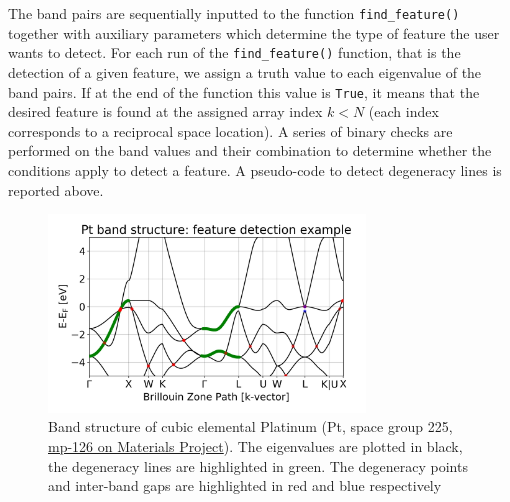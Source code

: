 \documentclass{article}
\begin{document}
The band pairs are sequentially inputted to the function  \texttt{find\_feature()} together with auxiliary parameters which determine the type of feature the user wants to detect. For each run of the \texttt{find\_feature()} function, that is the detection of a given feature, we assign a truth value to each eigenvalue of the band pairs. If at the end of the function this value is \texttt{True}, it means that the desired feature is found at the assigned array index $k < N$ (each index corresponds to a reciprocal space location). A series of binary checks are performed on the band values and their combination to determine whether the conditions apply to detect a feature. A pseudo-code to detect degeneracy lines is reported above.

\begin{figure}[H]
    \centering
    \includegraphics[width=0.75\textwidth]{SI/figures/mp-126_band-structure_features.png}
    \caption{Band structure of cubic elemental Platinum (Pt, space group 225, \href{https://materialsproject.org/materials/mp-126/}{mp-126 on Materials Project}). The eigenvalues are plotted in black, the degeneracy lines are highlighted in green. The degeneracy points and inter-band gaps are highlighted in red and blue respectively}
    \label{fig:feature_detection}
\end{figure}

%
%
\end{document}
